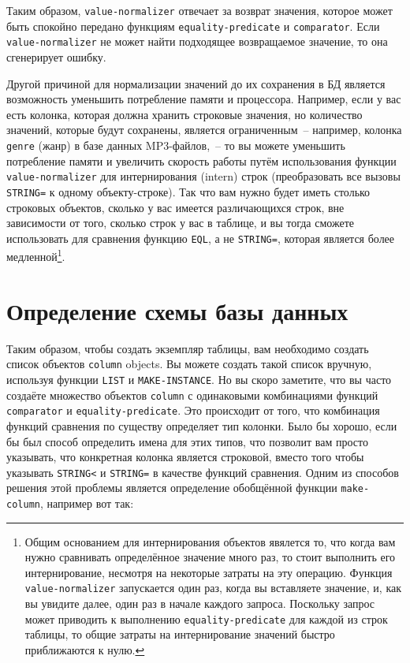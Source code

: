 Таким образом, \lstinline{value-normalizer} отвечает за возврат значения, которое может быть
спокойно передано функциям \lstinline{equality-predicate} и \lstinline{comparator}.  Если
\lstinline{value-normalizer} не может найти подходящее возвращаемое значение, то она
сгенерирует ошибку.

Другой причиной для нормализации значений до их сохранения в БД является возможность
уменьшить потребление памяти и процессора.  Например, если у вас есть колонка, которая
должна хранить строковые значения, но количество значений, которые будут сохранены,
является ограниченным~-- например, колонка \lstinline{genre} (жанр) в базе данных
MP3-файлов,~-- то вы можете уменьшить потребление памяти и увеличить скорость работы путём
использования функции \lstinline{value-normalizer} для интернирования (intern) строк
(преобразовать все вызовы \lstinline{STRING=} к одному объекту-строке).  Так что вам нужно
будет иметь столько строковых объектов, сколько у вас имеется различающихся строк, вне
зависимости от того, сколько строк у вас в таблице, и вы тогда сможете использовать для
сравнения функцию \lstinline{EQL}, а не \lstinline{STRING=}, которая является более
медленной\footnote{Общим основанием для интернирования объектов явялется то, что когда вам
  нужно сравнивать определённое значение много раз, то стоит выполнить его интернирование,
  несмотря на некоторые затраты на эту операцию.  Функция \lstinline{value-normalizer}
  запускается один раз, когда вы вставляете значение, и, как вы увидите далее, один раз в
  начале каждого запроса. Поскольку запрос может приводить к выполнению
  \lstinline{equality-predicate} для каждой из строк таблицы, то общие затраты на
  интернирование значений быстро приближаются к нулю.}\hspace{\footnotenegspace}.

\section{Определение схемы базы данных}

Таким образом, чтобы создать экземпляр таблицы, вам необходимо создать список объектов
\lstinline{column} objects.  Вы можете создать такой список вручную, используя функции
\lstinline{LIST} и \lstinline{MAKE-INSTANCE}.  Но вы скоро заметите, что вы часто создаёте множество
объектов \lstinline{column} с одинаковыми комбинациями функций \lstinline{comparator} и
\lstinline{equality-predicate}. Это происходит от того, что комбинация функций сравнения по
существу определяет тип колонки. Было бы хорошо, если бы был способ определить имена для
этих типов, что позволит вам просто указывать, что конкретная колонка является строковой,
вместо того чтобы указывать \lstinline{STRING<} и \lstinline{STRING=} в качестве функций сравнения.
Одним из способов решения этой проблемы является определение обобщённой функции
\lstinline{make-column}, например вот так:

